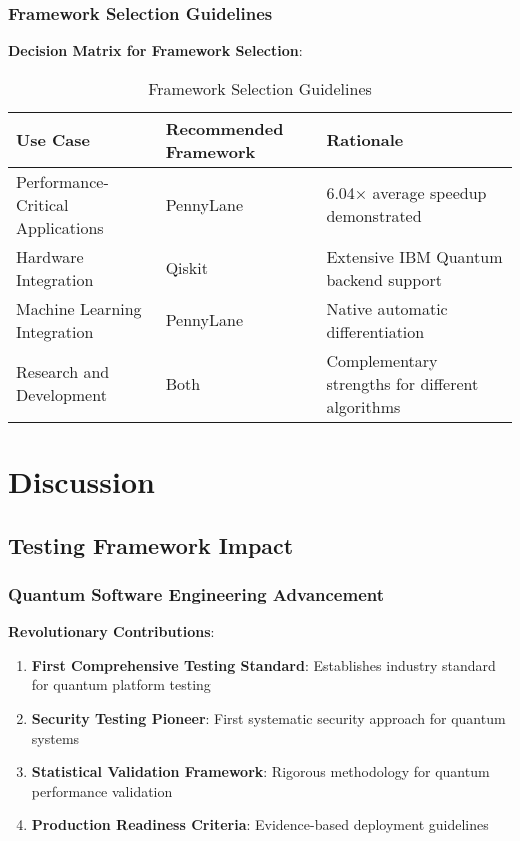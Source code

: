 \documentclass[12pt,a4paper]{article}
\begin{document}
\subsubsection{Framework Selection Guidelines}

\textbf{Decision Matrix for Framework Selection}:

\begin{table}[H]
\centering
\caption{Framework Selection Guidelines}
\begin{tabular}{@{}p{4cm}p{3cm}p{6cm}@{}}
\toprule
Use Case & Recommended Framework & Rationale \\
\midrule
Performance-Critical Applications & PennyLane & 6.04× average speedup demonstrated \\
Hardware Integration & Qiskit & Extensive IBM Quantum backend support \\
Machine Learning Integration & PennyLane & Native automatic differentiation \\
Research and Development & Both & Complementary strengths for different algorithms \\
\bottomrule
\end{tabular}
\end{table}

\section{Discussion}

\subsection{Testing Framework Impact}

\subsubsection{Quantum Software Engineering Advancement}

\textbf{Revolutionary Contributions}:
\begin{enumerate}
\item \textbf{First Comprehensive Testing Standard}: Establishes industry standard for quantum platform testing
\item \textbf{Security Testing Pioneer}: First systematic security approach for quantum systems
\item \textbf{Statistical Validation Framework}: Rigorous methodology for quantum performance validation
\item \textbf{Production Readiness Criteria}: Evidence-based deployment guidelines
\end{enumerate}
\end{document}
